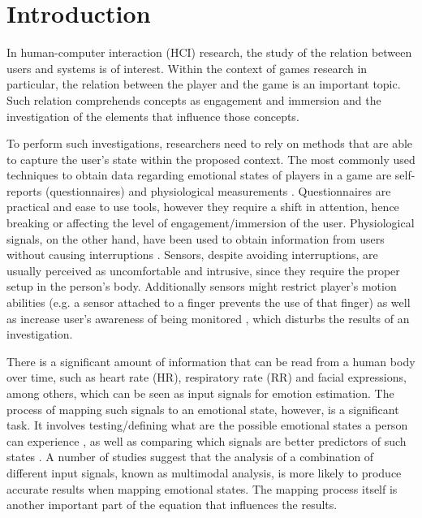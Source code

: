 \chapter{Introduction}
\label{c:introduction}

In human-computer interaction (HCI) research, the study of the relation between users and systems is of interest. Within the context of games research in particular, the relation between the player and the game is an important topic. Such relation comprehends concepts as engagement and immersion \parencite{boyle2012engagement} and the investigation of the elements that influence those concepts.

To perform such investigations, researchers need to rely on methods that are able to capture the user's state within the proposed context. The most commonly used techniques to obtain data regarding emotional states of players in a game are self-reports (questionnaires) and physiological measurements \parencite{mekler2014systematic}. Questionnaires are practical and ease to use tools, however they require a shift in attention, hence breaking or affecting the level of engagement/immersion of the user. Physiological signals, on the other hand, have been used to obtain information from users without causing interruptions \parencite{bousefsaf2013remote,yun2009game,rani2006empirical,tijs2008dynamic}. Sensors, despite avoiding interruptions, are usually perceived as uncomfortable and intrusive, since they require the proper setup in the person's body. Additionally sensors might restrict player's motion abilities (e.g. a sensor attached to a finger prevents the use of that finger) as well as increase user's awareness of being monitored \parencite{yamakoshi2007preliminary,yamaguchi2006evaluation,healey2005detecting}, which disturbs the results of an investigation.


There is a significant amount of information that can be read from a human body over time, such as heart rate (HR), respiratory rate (RR) and facial expressions, among others, which can be seen as input signals for emotion estimation. The process of mapping such signals to an emotional state, however, is a significant task. It involves testing/defining what are the possible emotional states a person can experience \cite{mandryk2006continuous}, as well as comparing which signals are better predictors of such states \cite{jerritta2011physiological}. A number of studies \cite{kukolja2014comparative} suggest that the analysis of a combination of different input signals, known as multimodal analysis, is more likely to produce accurate results when mapping emotional states. The mapping process itself is another important part of the equation that influences the results.

